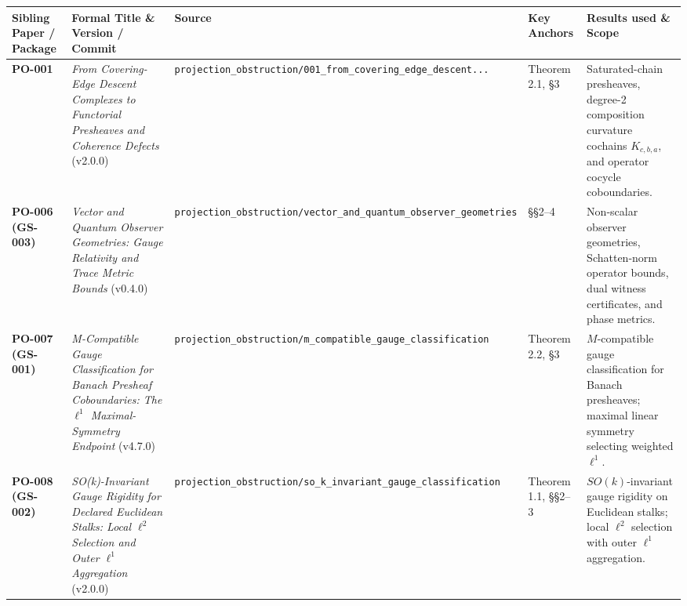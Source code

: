 \documentclass[
  11pt,
]{article}
\begin{document}
\begin{longtable}[]{@{}
  >{\raggedright\arraybackslash}p{}
  >{\raggedright\arraybackslash}p{}
  >{\raggedright\arraybackslash}p{}
  >{\raggedright\arraybackslash}p{}
  >{\raggedright\arraybackslash}p{}@{}}
\toprule\noalign{}
\begin{minipage}[b]{\linewidth}\raggedright
Sibling Paper / Package
\end{minipage} & \begin{minipage}[b]{\linewidth}\raggedright
Formal Title \& Version / Commit
\end{minipage} & \begin{minipage}[b]{\linewidth}\raggedright
Source
\end{minipage} & \begin{minipage}[b]{\linewidth}\raggedright
Key Anchors
\end{minipage} & \begin{minipage}[b]{\linewidth}\raggedright
Results used \& Scope
\end{minipage} \\
\midrule\noalign{}
\endhead
\bottomrule\noalign{}
\endlastfoot
\textbf{PO-001} & \emph{From Covering-Edge Descent Complexes to Functorial Presheaves and Coherence Defects} (v2.0.0) & \texttt{projection\_obstruction/001\_from\_covering\_edge\_descent...} & Theorem 2.1, §3 & Saturated-chain presheaves, degree-2 composition curvature cochains \(K_{c,b,a}\), and operator cocycle coboundaries. \\
\textbf{PO-006 (GS-003)} & \emph{Vector and Quantum Observer Geometries: Gauge Relativity and Trace Metric Bounds} (v0.4.0) & \texttt{projection\_obstruction/vector\_and\_quantum\_observer\_geometries} & §§2--4 & Non-scalar observer geometries, Schatten-norm operator bounds, dual witness certificates, and phase metrics. \\
\textbf{PO-007 (GS-001)} & \emph{M-Compatible Gauge Classification for Banach Presheaf Coboundaries: The \(\ell^1\) Maximal-Symmetry Endpoint} (v4.7.0) & \texttt{projection\_obstruction/m\_compatible\_gauge\_classification} & Theorem 2.2, §3 & \(M\)-compatible gauge classification for Banach presheaves; maximal linear symmetry selecting weighted \(\ell^1\). \\
\textbf{PO-008 (GS-002)} & \emph{SO(k)-Invariant Gauge Rigidity for Declared Euclidean Stalks: Local \(\ell^2\) Selection and Outer \(\ell^1\) Aggregation} (v2.0.0) & \texttt{projection\_obstruction/so\_k\_invariant\_gauge\_classification} & Theorem 1.1, §§2--3 & \(SO(k)\)-invariant gauge rigidity on Euclidean stalks; local \(\ell^2\) selection with outer \(\ell^1\) aggregation. \\

\end{longtable}
\end{document}
